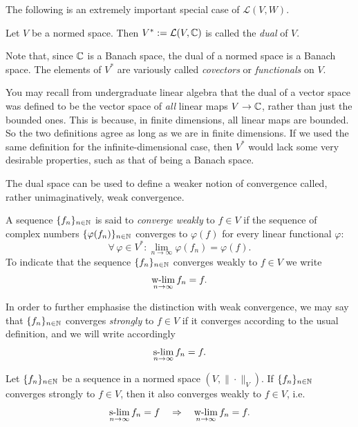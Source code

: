 The following is an extremely important special case of $\mathcal{L}(V,W)$.

\begin{definition}
Let $V$ be a normed space. Then $V^*:=\mathcal{L}(V,\mathbb{C})$ is called the \emph{dual} of $V$.
\end{definition}

Note that, since $\mathbb{C}$ is a Banach space, the dual of a normed space is a Banach space. The elements of $V^*$ are variously called \emph{covectors} or \emph{functionals} on $V$. 
\begin{remark}
You may recall from undergraduate linear algebra that the dual of a vector space was defined to be the vector space of \emph{all} linear maps $V\to\mathbb{C}$, rather than just the bounded ones. This is because, in finite dimensions, all linear maps are bounded. So the two definitions agree as long as we are in finite dimensions. If we used the same definition for the infinite-dimensional case, then $V^*$ would lack some very desirable properties, such as that of being a Banach space.
\end{remark}
The dual space can be used to define a weaker notion of convergence called, rather unimaginatively, weak convergence. 

\begin{definition}
A sequence $\{f_n\}_{n\in \mathbb{N}}$ is said to \emph{converge
weakly} to $f\in V$ if the sequence of complex
numbers $\{\varphi(f_n)\}_{n\in \mathbb{N}}$ converges to \(\varphi(f)\) for
every linear functional \(\varphi\):
\begin{equation*}
\forall \, \varphi\in V^* : \lim_{n\to\infty}\varphi(f_n) = \varphi(f).
\end{equation*}
To indicate that the sequence $\{f_n\}_{n\in \mathbb{N}}$ converges weakly to
$f\in V$ we write
\begin{equation*}
\operatorname*{w-lim}_{n\to \infty} f_n = f.
\end{equation*}
\end{definition}

In order to further emphasise the distinction with weak convergence,
we may say that $\{f_n\}_{n\in \mathbb{N}}$ converges \emph{strongly} to $f\in
V$ if it converges according to the usual definition, and we will
write accordingly
\begin{equation*}
\operatorname*{s-lim}_{n\to \infty} f_n = f.
\end{equation*}

\begin{proposition}
Let $\{f_n\}_{n\in \mathbb{N}}$ be a sequence in a normed space $(V,\|\cdot\|_V)$. If $\{f_n\}_{n\in \mathbb{N}}$ converges strongly to $f\in V$, then it also converges weakly to $f\in V$, i.e.\
\begin{equation*}
\operatorname*{s-lim}_{n\to \infty} f_n = f \quad \Rightarrow \quad \operatorname*{w-lim}_{n\to \infty} f_n = f.
\end{equation*}
\end{proposition}

